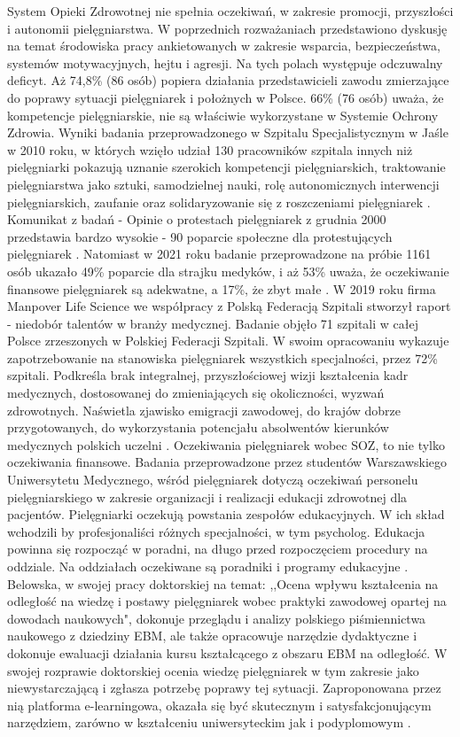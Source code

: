 \documentclass[a4paper,12pt,twoside,openright]{mwrep}
\begin{document}
System Opieki Zdrowotnej nie spełnia oczekiwań, w zakresie promocji, przyszłości i autonomii pielęgniarstwa. W poprzednich rozważaniach przedstawiono dyskusję  na temat środowiska pracy ankietowanych w zakresie wsparcia, bezpieczeństwa, systemów motywacyjnych, hejtu  i agresji. Na tych polach występuje odczuwalny deficyt. Aż 74,8\%  (86 osób) popiera działania przedstawicieli zawodu zmierzające do poprawy sytuacji pielęgniarek i położnych w Polsce.  66\% (76 osób) uważa, że kompetencje pielęgniarskie, nie są właściwie wykorzystane w Systemie Ochrony Zdrowia. Wyniki badania przeprowadzonego w Szpitalu Specjalistycznym w Jaśle w 2010 roku, w których wzięło udział 130 pracowników szpitala innych niż pielęgniarki pokazują uznanie szerokich kompetencji pielęgniarskich, traktowanie pielęgniarstwa jako sztuki, samodzielnej nauki, rolę autonomicznych interwencji pielęgniarskich, zaufanie oraz solidaryzowanie się z roszczeniami pielęgniarek \cite{skorupska}. Komunikat z badań - Opinie o protestach pielęgniarek z grudnia 2000 przedstawia bardzo wysokie - 90  poparcie  społeczne dla protestujących pielęgniarek \cite{cebos}. Natomiast w 2021 roku badanie przeprowadzone na próbie 1161 osób ukazało 49\% poparcie dla strajku medyków, i aż 53\% uważa, że oczekiwanie finansowe pielęgniarek są adekwatne, a 17\%, że zbyt małe \cite{cebos2}. W 2019 roku firma Manpover Life Science we współpracy z Polską Federacją Szpitali stworzył raport - niedobór talentów w branży medycznej. Badanie objęło 71 szpitali w całej Polsce zrzeszonych w Polskiej Federacji Szpitali. W swoim opracowaniu wykazuje zapotrzebowanie na stanowiska pielęgniarek wszystkich specjalności, przez 72\% szpitali. Podkreśla brak integralnej, przyszłościowej wizji kształcenia kadr medycznych, dostosowanej do zmieniających się okoliczności, wyzwań zdrowotnych. Naświetla zjawisko emigracji zawodowej,  do krajów dobrze przygotowanych, do wykorzystania potencjału absolwentów kierunków medycznych polskich uczelni \cite{federacja}.
Oczekiwania pielęgniarek wobec SOZ, to nie tylko oczekiwania finansowe. Badania przeprowadzone przez studentów Warszawskiego Uniwersytetu Medycznego, wśród pielęgniarek dotyczą oczekiwań personelu pielęgniarskiego w zakresie organizacji i realizacji edukacji zdrowotnej dla pacjentów.  Pielęgniarki oczekują powstania zespołów edukacyjnych. W ich skład wchodzili by profesjonaliści różnych specjalności, w tym psycholog. Edukacja powinna się rozpocząć w poradni, na długo przed rozpoczęciem procedury na oddziale. Na oddziałach oczekiwane są poradniki i programy edukacyjne \cite{soz}.
Belowska, w swojej pracy doktorskiej na temat: ,,Ocena wpływu kształcenia na odległość na wiedzę i postawy pielęgniarek wobec praktyki zawodowej opartej na dowodach naukowych", dokonuje przeglądu i analizy polskiego piśmiennictwa naukowego z dziedziny EBM, ale także opracowuje narzędzie dydaktyczne i dokonuje ewaluacji działania kursu kształcącego z obszaru EBM na odległość. W swojej rozprawie doktorskiej ocenia wiedzę pielęgniarek w tym zakresie jako niewystarczającą i zgłasza potrzebę poprawy tej sytuacji. Zaproponowana przez nią platforma e-learningowa, okazała się być skutecznym i satysfakcjonującym narzędziem, zarówno w kształceniu uniwersyteckim jak i podyplomowym \cite{belowska}.
\end{document}
